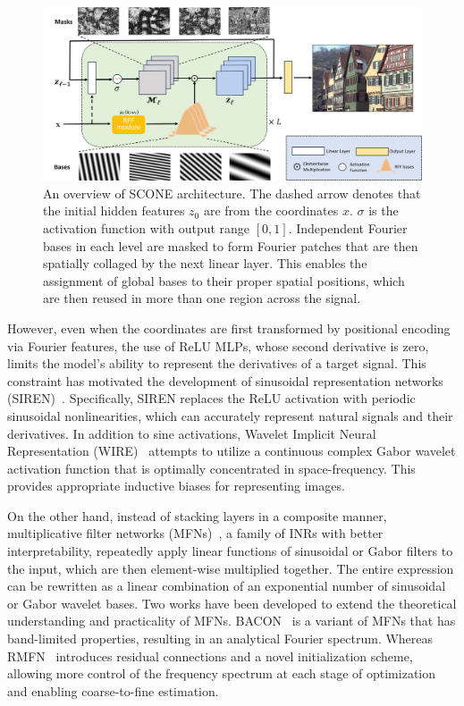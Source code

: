 \documentclass[letterpaper]{article} %
\begin{document}
\begin{figure}[th]
    \centering
    \includegraphics[width=2\columnwidth]{Figures/architecture.jpg}  
    \caption{An overview of SCONE architecture. The dashed arrow denotes that the initial hidden features $z_{0}$ are from the coordinates $x$. $\sigma$ is the activation function with output range $[0, 1]$. Independent Fourier bases in each level are masked to form Fourier patches that are then spatially collaged by the next linear layer. This enables the assignment of global bases to their proper spatial positions, which are then reused in more than one region across the signal.}
    \label{fig:architecture}
\end{figure}

However, even when the coordinates are first transformed by positional encoding via Fourier features, the use of ReLU MLPs, whose second derivative is zero, limits the model's ability to represent the derivatives of a target signal. This constraint has motivated the development of sinusoidal representation networks (SIREN)~\cite{2020siren}. Specifically, SIREN replaces the ReLU activation with periodic sinusoidal nonlinearities, which can accurately represent natural signals and their derivatives. In addition to sine activations, Wavelet Implicit Neural Representation (WIRE)~\cite{saragadam2023wire} attempts to utilize a continuous complex Gabor wavelet activation function that is optimally concentrated in space-frequency. This provides appropriate inductive biases for representing images.

On the other hand, instead of stacking layers in a composite manner, multiplicative filter networks (MFNs)~\cite{fathony2020multiplicative}, a family of INRs with better interpretability, repeatedly apply linear functions of sinusoidal or Gabor filters to the input, which are then element-wise multiplied together. The entire expression can be rewritten as a linear combination of an exponential number of sinusoidal or Gabor wavelet bases. Two works have been developed to extend the theoretical understanding and practicality of MFNs. BACON~\cite{lindell2022bacon} is a variant of MFNs that has band-limited properties, resulting in an analytical Fourier spectrum. Whereas RMFN~\cite{shekarforoush2022residual} introduces residual connections and a novel initialization scheme, allowing more control of the frequency spectrum at each stage of optimization and enabling coarse-to-fine estimation.
\end{document}
